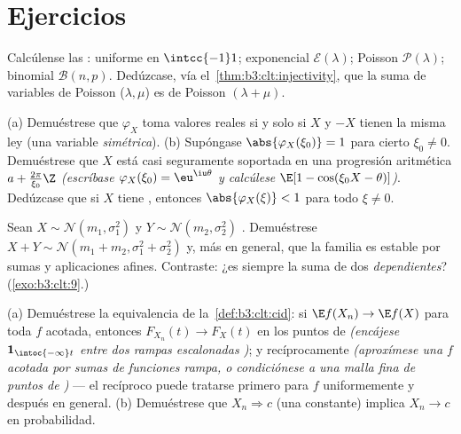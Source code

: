 \section{Ejercicios}

\begin{exercise}[$\star$]\label{exo:b3:clt:1}
Calcúlense las :
uniforme en $\intcc{-1}1$; exponencial $\mathcal E(\lambda)$; Poisson
$\mathcal P(\lambda)$; binomial $\mathcal B(n, p)$. Dedúzcase, vía
el~\cref{thm:b3:clt:injectivity}, que la suma de variables de Poisson
($\lambda, \mu$) es de Poisson $(\lambda +
\mu)$.
\end{exercise}

\begin{exercise}[$\star\star$]\label{exo:b3:clt:2}
(a) Demuéstrese que $\varphi_X$ toma valores reales si y solo si $X$ y
$-X$ tienen la misma ley (una variable \emph{simétrica}). (b) Supóngase
$\abs{\varphi_X(\xi_0)} = 1$ para cierto $\xi_0 \neq
0$. Demuéstrese que $X$ está casi seguramente soportada en una
progresión aritmética $a + \frac{2\pi}{\xi_0}\Z$ \emph{(escríbase
$\varphi_X(\xi_0) = \eu^{\iu\theta}$ y calcúlese $\E[1 -
\cos(\xi_0X - \theta)]$)}. Dedúzcase que si $X$ tiene
, entonces
$\abs{\varphi_X(\xi)} < 1$ para todo $\xi \neq 0$.
\end{exercise}

\begin{exercise}[$\star\star$]\label{exo:b3:clt:3}
Sean $X \sim \mathcal N(m_1, \sigma_1^2)$ y $Y \sim
\mathcal N(m_2, \sigma_2^2)$
. Demuéstrese
$X + Y
\sim \mathcal N(m_1 + m_2, \sigma_1^2 + \sigma_2^2)$ y, más en general,
que la familia  es estable
por sumas  y
aplicaciones afines. Contraste: ¿es siempre
 la suma de dos
 \emph{dependientes}?
(\cref{exo:b3:clt:9}.)
\end{exercise}

\begin{exercise}[$\star\star$]\label{exo:b3:clt:4}
(a) Demuéstrese la equivalencia de la~\cref{def:b3:clt:cid}: si
$\E f(X_n) \to \E f(X)$ para toda $f$
 acotada, entonces
$F_{X_n}(t) \to F_X(t)$ en los puntos de
 \emph{(encájese
$\mathbf 1_{\intoc{-\infty}t}$ entre dos rampas escalonadas
)}; y recíprocamente
\emph{(aproxímese una $f$ 
acotada por sumas de funciones rampa, o condiciónese a una malla fina de
puntos de )} --- el
recíproco puede tratarse primero para $f$ uniformemente
 y después en general. (b)
Demuéstrese que $X_n \Rightarrow c$ (una constante) implica $X_n
\to c$ en probabilidad.
\end{exercise}

